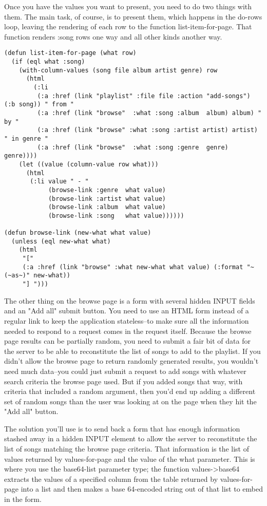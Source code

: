 Once you have the values you want to present, you need to do two things with them. The
main task, of course, is to present them, which happens in the do-rows loop, leaving the
rendering of each row to the function list-item-for-page. That function renders :song rows
one way and all other kinds another way.

\begin{lstlisting}
(defun list-item-for-page (what row)
  (if (eql what :song)
    (with-column-values (song file album artist genre) row
      (html
        (:li
         (:a :href (link "playlist" :file file :action "add-songs") (:b song)) " from "
         (:a :href (link "browse"  :what :song :album  album) album) " by "
         (:a :href (link "browse" :what :song :artist artist) artist) " in genre "
         (:a :href (link "browse"  :what :song :genre  genre) genre))))
    (let ((value (column-value row what)))
      (html
       (:li value " - "
            (browse-link :genre  what value)
            (browse-link :artist what value)
            (browse-link :album  what value)
            (browse-link :song   what value))))))

(defun browse-link (new-what what value)
  (unless (eql new-what what)
    (html
     "[" 
     (:a :href (link "browse" :what new-what what value) (:format "~(~as~)" new-what))
     "] ")))
\end{lstlisting}

The other thing on the browse page is a form with several hidden INPUT fields and an "Add
all" submit button. You need to use an HTML form instead of a regular link to keep the
application stateless--to make sure all the information needed to respond to a request
comes in the request itself. Because the browse page results can be partially random, you
need to submit a fair bit of data for the server to be able to reconstitute the list of
songs to add to the playlist. If you didn't allow the browse page to return randomly
generated results, you wouldn't need much data--you could just submit a request to add
songs with whatever search criteria the browse page used. But if you added songs that way,
with criteria that included a random argument, then you'd end up adding a different set of
random songs than the user was looking at on the page when they hit the "Add all" button.

The solution you'll use is to send back a form that has enough information stashed away in
a hidden INPUT element to allow the server to reconstitute the list of songs matching the
browse page criteria. That information is the list of values returned by values-for-page
and the value of the what parameter. This is where you use the base64-list parameter type;
the function values->base64 extracts the values of a specified column from the table
returned by values-for-page into a list and then makes a base 64-encoded string out of
that list to embed in the form.

